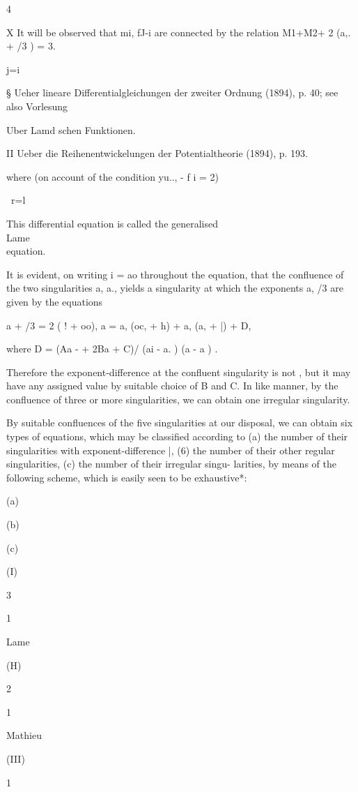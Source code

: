 4

X It will be observed that mi, fJ-i are connected by the relation
M1+M2+ 2 (a,. + /3 ) = 3.

j=i

§ Ueher lineare Differentialgleichungen der zweiter Ordnung (1894), p.
40; see also Vorlesung

Uber Lamd schen Funktionen.

II Ueber die Reihenentwickelungen der Potentialtheorie (1894), p. 193.

%
%

where (on account of the condition yu.., - f i = 2)

\ r=l

This differential equation is called the generalised \\Lame\\ equation.

It is evident, on writing i = ao throughout the equation, that the
confluence of the two singularities a, a., yields a singularity at
which the exponents a, /3 are given by the equations

a + /3 = 2 ( ! + oo), a = a, (oc, + h) + a, (a, + |) + D,

where D = (Aa - + 2Ba + C)/ (ai - a. ) (a - a ) .

Therefore the exponent-difference at the confluent singularity is not
, but it may have any assigned value by suitable choice of B and C. In
like manner, by the confluence of three or more singularities, we can
obtain one irregular singularity.

By suitable confluences of the five singularities at our disposal, we
can obtain six types of equations, which may be classified according
to (a) the number of their singularities with exponent-difference |,
(6) the number of their other regular singularities, (c) the number of
their irregular singu- larities, by means of the following scheme,
which is easily seen to be exhaustive*:

(a)

(b)

(c)

(I)

3

1

Lame

(H)

2

1

Mathieu

(III)

1

